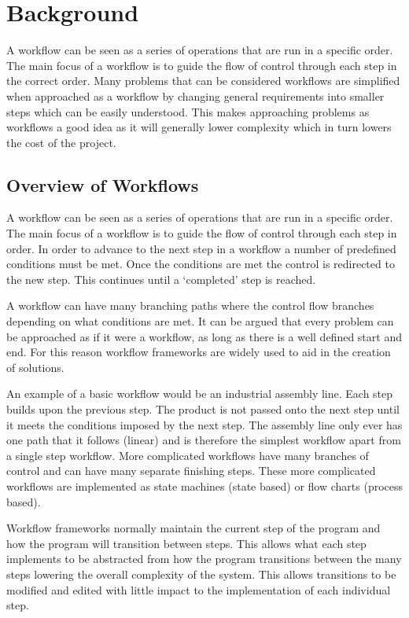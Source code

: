 \chapter {Background}

A workflow can be seen as a series of operations that are run in a specific order. The main focus of a workflow is to guide the flow of control through each step in the correct order. Many problems that can be considered workflows are simplified when approached as a workflow by changing general requirements into smaller steps which can be easily understood. This makes approaching problems as workflows a good idea as it will generally lower complexity which in turn lowers the cost of the project.


\section {Overview of Workflows}
\label {sec:overview-of-workflows}

A workflow can be seen as a series of operations that are run in a specific order. The main focus of a workflow is to guide the flow of control through each step in order. In order to advance to the next step in a workflow a number of predefined conditions must be met. Once the conditions are met the control is redirected to the new step. This continues until a ‘completed’ step is reached.

A workflow can have many branching paths where the control flow branches depending on what conditions are met. It can be argued that every problem can be approached as if it were a workflow, as long as there is a well defined start and end. For this reason workflow frameworks are widely used to aid in the creation of solutions.

An example of a basic workflow would be an industrial assembly line. Each step builds upon the previous step. The product is not passed onto the next step until it meets the conditions imposed by the next step. The assembly line only ever has one path that it follows (linear) and is therefore the simplest workflow apart from a single step workflow. More complicated workflows have many branches of control and can have many separate finishing steps. These more complicated workflows are implemented as state machines (state based) or flow charts (process based).

Workflow frameworks normally maintain the current step of the program and how the program will transition between steps. This allows what each step implements to be abstracted from how the program transitions between the many steps lowering the overall complexity of the system. This allows transitions to be modified and edited with little impact to the implementation of each individual step.

